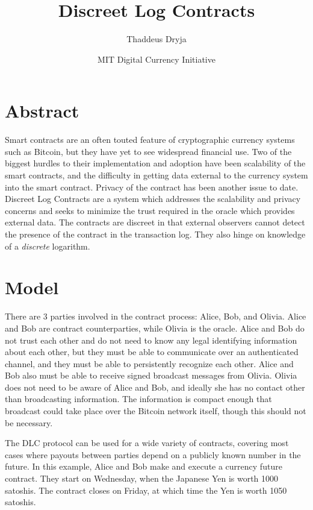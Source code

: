 \documentclass[10pt]{article}
\title{\textbf{Discreet Log Contracts}}
\author{Thaddeus Dryja}
\date{MIT Digital Currency Initiative}
\begin{document}
\maketitle

\section*{Abstract}

Smart contracts \cite{szabo1997formalizing} are an often touted feature of cryptographic currency systems such as Bitcoin, but they have yet to see widespread financial use.  Two of the biggest hurdles to their implementation and adoption have been scalability of the smart contracts, and the difficulty in getting data external to the currency system into the smart contract.  Privacy of the contract has been another issue to date.  Discreet Log Contracts are a system which addresses the scalability and privacy concerns and seeks to minimize the trust required in the oracle which provides external data.  The contracts are discreet in that external observers cannot detect the presence of the contract in the transaction log.  They also hinge on knowledge of a \textit{discrete} logarithm.


\section*{Model}

There are 3 parties involved in the contract process: Alice, Bob, and Olivia.  Alice and Bob are contract counterparties, while Olivia is the oracle.  Alice and Bob do not trust each other and do not need to know any legal identifying information about each other, but they must be able to communicate over an authenticated channel, and they must be able to persistently recognize each other.  Alice and Bob also must be able to receive signed broadcast messages from Olivia.  Olivia does not need to be aware of Alice and Bob, and ideally she has no contact other than broadcasting information.  The information is compact enough that broadcast could take place over the Bitcoin network itself, though this should not be necessary.

The DLC protocol can be used for a wide variety of contracts, covering most cases where payouts between parties depend on a publicly known number in the future.  In this example, Alice and Bob make and execute a currency future contract.  They start on Wednesday, when the Japanese Yen is worth 1000 satoshis.  The contract closes on Friday, at which time the Yen is worth 1050 satoshis.
\end{document}
